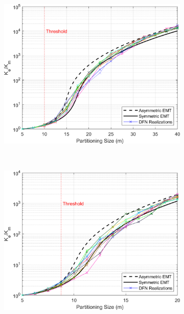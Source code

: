 \documentclass[Supplementary.tex]{subfiles}
\begin{document}
\begin{figure}[ht]
\begin{subfigure}{0.3\textwidth}
        \includegraphics[width=\textwidth]{FSU/Plot_FSU_Case_09_nohead.png}
        \label{fig:FSU_9}
    \end{subfigure}
    \\
    \begin{subfigure}{0.3\textwidth}
        \includegraphics[width=\textwidth]{FSU/Plot_FSU_Case_10_nohead.png}
        \label{fig:FSU_10}
    \end{subfigure}
    \begin{subfigure}{0.3\textwidth}

\end{subfigure}
\end{figure}
\end{document}
